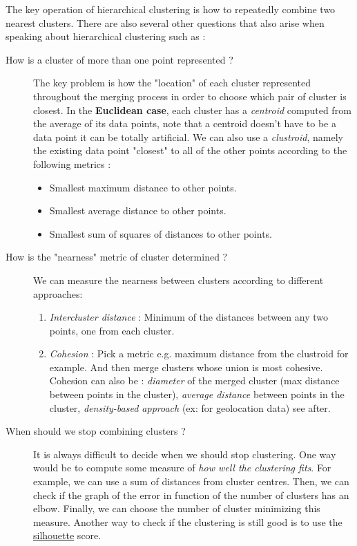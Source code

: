 The key operation of hierarchical clustering is how to repeatedly combine two nearest clusters. There are also several other questions that also arise when speaking about hierarchical clustering such as :
\begin{description}
	\item [How is a cluster of more than one point represented ?]
The key problem is how the "location" of each cluster represented throughout the merging process in order to choose which pair of cluster is closest. In the \textbf{Euclidean case}, each cluster has a \emph{centroid} computed from the average of its data points, note that a centroid doesn't have to be a data point it can be totally artificial. We can also use a \emph{clustroid}, namely the existing data point "closest" to all of the other points according to the following metrics :
\begin{itemize}
	\item Smallest maximum distance to other points.
	\item Smallest average distance to other points.
	\item Smallest sum of squares of distances to other points.
\end{itemize}
	\item [How is the "nearness" metric of cluster determined ?]
We can measure the nearness between clusters according to different approaches:
\begin{enumerate}
	\item \emph{Intercluster distance} : Minimum of the distances between any two points, one from each cluster.
	\item \emph{Cohesion} : Pick a metric e.g. maximum distance from the clustroid for example. And then merge clusters whose union is most cohesive. Cohesion can also be : \emph{diameter} of the merged cluster (max distance between points in the cluster), \emph{average distance} between points in the cluster, \emph{density-based approach} (ex: for geolocation data) see after.
\end{enumerate} 
	\item [When should we stop combining clusters ?] 
	It is always difficult to decide when we should stop clustering. One way would be to compute some measure of \emph{how well the clustering fits}. For example, we can use a sum of distances from cluster centres. Then, we can check if the graph of the error in function of the number of clusters has an elbow. Finally, we can choose the number of cluster minimizing this measure. Another way to check if the clustering is still good is to use the \href{https://en.wikipedia.org/wiki/Silhouette\_(clustering)}{silhouette} score. 
\end{description}

